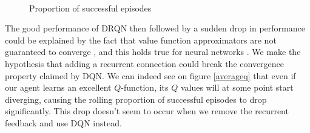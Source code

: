 \documentclass[letterpaper]{article}
\begin{document}
\begin{figure}
	\\
	\caption{Proportion of successful episodes}
	\label{successrate}
\end{figure}

The good performance of DRQN then followed by a sudden drop in performance could
be explained by the fact that value function approximators are not guaranteed
to converge \citep{divergenceofRL}, and this holds true for 
neural networks \citep{convergenceofRL}. 
We make the hypothesis that adding a recurrent connection could break the 
convergence property claimed by DQN.
We can indeed see on figure \ref{averageq} that
even if our agent learns an excellent $Q$-function, its $Q$ values will at some
point start diverging, causing the rolling proportion of successful episodes
to drop significantly. This drop doesn't seem to occur when we remove the
recurrent feedback and use DQN instead.\\
\end{document}
